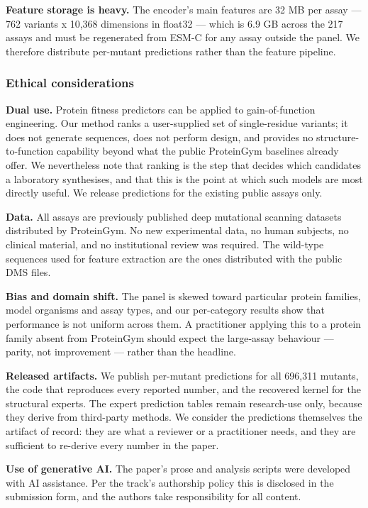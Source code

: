 \documentclass[sigconf,review,nonacm]{acmart}
\begin{document}
\textbf{Feature storage is heavy.} The encoder's main features are 32 MB per assay --- 762 variants x 10,368
dimensions in float32 --- which is 6.9 GB across the 217 assays and must be regenerated from ESM-C for
any assay outside the panel. We therefore distribute per-mutant predictions rather than the feature
pipeline.

\hypertarget{ethical-considerations}{%
\subsubsection{Ethical considerations}\label{ethical-considerations}}

\textbf{Dual use.} Protein fitness predictors can be applied to gain-of-function engineering. Our method
ranks a user-supplied set of single-residue variants; it does not generate sequences, does not perform
design, and provides no structure-to-function capability beyond what the public ProteinGym baselines
already offer. We nevertheless note that ranking is the step that decides which candidates a laboratory
synthesises, and that this is the point at which such models are most directly useful. We release
predictions for the existing public assays only.

\textbf{Data.} All assays are previously published deep mutational scanning datasets distributed by
ProteinGym. No new experimental data, no human subjects, no clinical material, and no institutional
review was required. The wild-type sequences used for feature extraction are the ones distributed with
the public DMS files.

\textbf{Bias and domain shift.} The panel is skewed toward particular protein families, model organisms and
assay types, and our per-category results show that performance is not uniform across them. A
practitioner applying this to a protein family absent from ProteinGym should expect the large-assay
behaviour --- parity, not improvement --- rather than the headline.

\textbf{Released artifacts.} We publish per-mutant predictions for all 696,311 mutants, the code that
reproduces every reported number, and the recovered kernel for the structural experts. The expert
prediction tables remain research-use only, because they derive from third-party methods. We consider
the predictions themselves the artifact of record: they are what a reviewer or a practitioner needs,
and they are sufficient to re-derive every number in the paper.

\textbf{Use of generative AI.} The paper's prose and analysis scripts were developed with AI assistance.
Per the track's authorship policy this is disclosed in the submission form, and the authors take
responsibility for all content.
\end{document}
